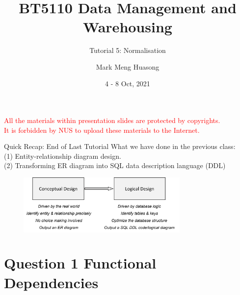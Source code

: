 \title{BT5110 Data Management and Warehousing}

\subtitle{Tutorial 5: Normalisation}

\author{Mark Meng Huasong}



\date{4 - 8 Oct, 2021}

\begin{frame}
	\titlepage
	\begin{tcolorbox}
		\begin{center}
			{\scriptsize \textcolor{red}{All the materials within presentation slides are protected by copyrights.\\
					It is forbidden by NUS to upload these materials to the Internet.}}
		\end{center}
	\end{tcolorbox}
\end{frame}

\begin{frame}[fragile]{Quick Recap: End of Last Tutorial}
	What we have done in the previous class:\\\vspace{5pt}
	(1) Entity-relationship diagram design. \\
	(2) Transforming ER diagram into SQL data description language (DDL)\\\vspace{5pt}
	\begin{figure}
		\includegraphics[width=0.75\textwidth, trim=0 0 0 0, clip]{t5/images/steps.png}
	\end{figure}
\end{frame}

\section*{Question 1 Functional Dependencies}

